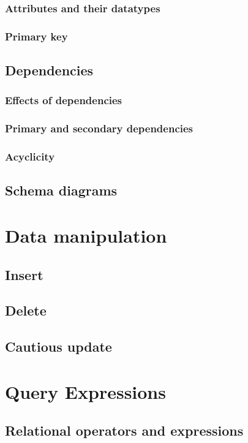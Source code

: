 \documentclass[letter,10pt]{article}
\begin{document}
\subsubsection{Attributes and their datatypes}
\subsubsection{Primary key}

\subsection{Dependencies}
\subsubsection{Effects of dependencies}
\subsubsection{Primary and secondary dependencies}
\subsubsection{Acyclicity}

\subsection{Schema diagrams}

\section{Data manipulation}
\subsection{Insert}
\subsection{Delete}
\subsection{Cautious update}

\section{Query Expressions}
\subsection{Relational operators and expressions}
\end{document}
